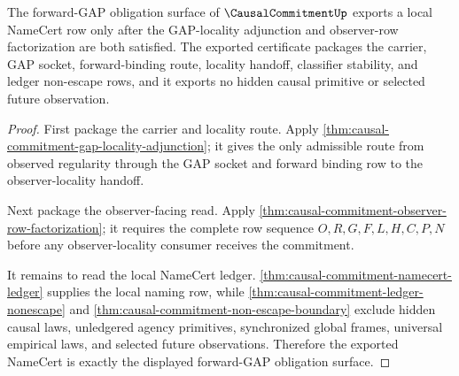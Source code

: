 \begin{theorem}
\label{thm:causal-commitment-forward-gap-namecert-export}
The forward-GAP obligation surface of $\CausalCommitmentUp$ exports a local
NameCert row only after the GAP-locality adjunction and observer-row
factorization are both satisfied. The exported certificate packages the
carrier, GAP socket, forward-binding route, locality handoff, classifier
stability, and ledger non-escape rows, and it exports no hidden causal
primitive or selected future observation.
\end{theorem}
\begin{proof}
First package the carrier and locality route. Apply
\autoref{thm:causal-commitment-gap-locality-adjunction}; it gives the only
admissible route from observed regularity through the GAP socket and forward
binding row to the observer-locality handoff.

Next package the observer-facing read. Apply
\autoref{thm:causal-commitment-observer-row-factorization}; it requires the
complete row sequence $O,R,G,F,L,H,C,P,N$ before any observer-locality
consumer receives the commitment.

It remains to read the local NameCert ledger.
\autoref{thm:causal-commitment-namecert-ledger} supplies the local naming row,
while \autoref{thm:causal-commitment-ledger-nonescape} and
\autoref{thm:causal-commitment-non-escape-boundary} exclude hidden causal
laws, unledgered agency primitives, synchronized global frames, universal
empirical laws, and selected future observations. Therefore the exported
NameCert is exactly the displayed forward-GAP obligation surface.
\end{proof}

